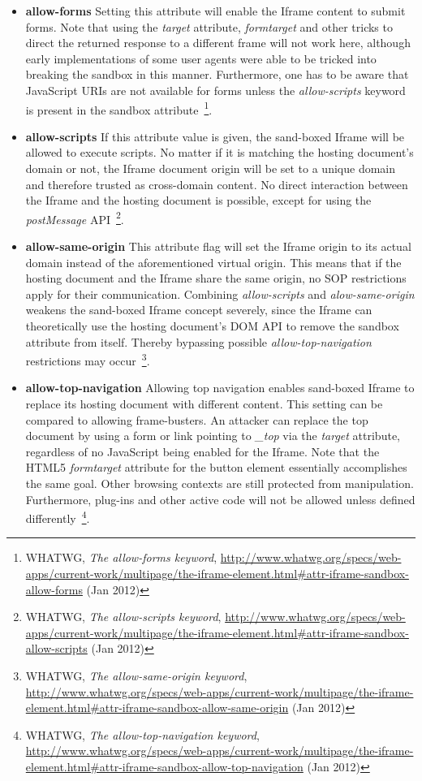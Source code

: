     \begin{itemize}
      \item \textbf{allow-forms} Setting this attribute will enable the Iframe content to submit forms. Note that using the \textit{target} attribute, \textit{formtarget} and other tricks to direct the returned response to a different frame will not work here, although early implementations of some user agents were able to be tricked into breaking the sandbox in this manner. Furthermore, one has to be aware that JavaScript URIs are not available for forms unless the \textit{allow-scripts} keyword is present in the sandbox attribute~\footnote{WHATWG, \textit{The allow-forms keyword}, \url{http://www.whatwg.org/specs/web-apps/current-work/multipage/the-iframe-element.html#attr-iframe-sandbox-allow-forms} (Jan 2012)}.
      \item \textbf{allow-scripts} If this attribute value is given, the sand-boxed Iframe will be allowed to execute scripts. No matter if it is matching the hosting document's domain or not, the Iframe document origin will be set to a unique domain and therefore trusted as cross-domain content. No direct interaction between the Iframe and the hosting document is possible, except for using the \textit{postMessage} API~\footnote{WHATWG, \textit{The allow-scripts keyword}, \url{http://www.whatwg.org/specs/web-apps/current-work/multipage/the-iframe-element.html#attr-iframe-sandbox-allow-scripts} (Jan 2012)}.
      \item \textbf{allow-same-origin} This attribute flag will set the Iframe origin to its actual domain instead of the aforementioned virtual origin. This means that if the hosting document and the Iframe share the same origin, no SOP restrictions apply for their communication. Combining \textit{allow-scripts} and \textit{alow-same-origin} weakens the sand-boxed Iframe concept severely, since the Iframe can theoretically use the hosting document's DOM API to remove the sandbox attribute from itself. Thereby bypassing possible \textit{allow-top-navigation} restrictions may occur~\footnote{WHATWG, \textit{The allow-same-origin keyword}, \url{http://www.whatwg.org/specs/web-apps/current-work/multipage/the-iframe-element.html#attr-iframe-sandbox-allow-same-origin} (Jan 2012)}.
      \item \textbf{allow-top-navigation} Allowing top navigation enables sand-boxed Iframe to replace its hosting document with different content. This setting can be compared to allowing frame-busters. An attacker can replace the top document by using a form or link pointing to \textit{\_top} via the \textit{target} attribute, regardless of no JavaScript being enabled for the Iframe. Note that the HTML5 \textit{formtarget} attribute for the button element essentially accomplishes the same goal. Other browsing contexts are still protected from manipulation. Furthermore, plug-ins and other active code will not be allowed unless defined differently~\footnote{WHATWG, \textit{The allow-top-navigation keyword}, \url{http://www.whatwg.org/specs/web-apps/current-work/multipage/the-iframe-element.html#attr-iframe-sandbox-allow-top-navigation} (Jan 2012)}.
    \end{itemize}


